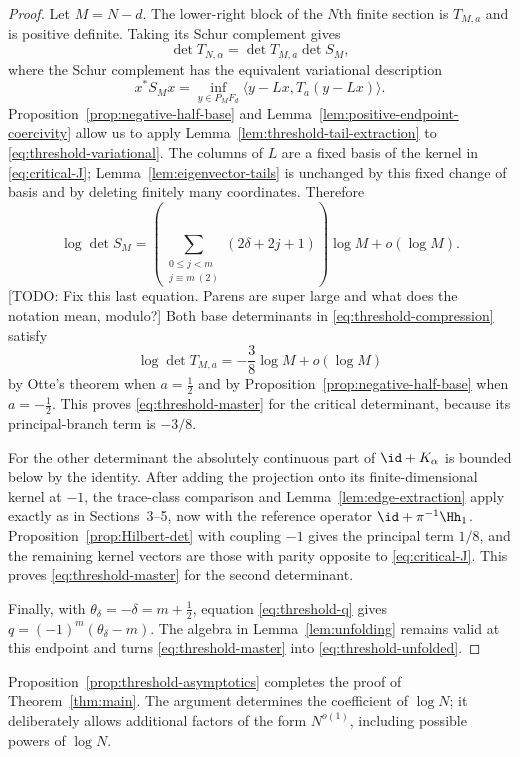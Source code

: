 \begin{proof}
Let $M=N-d$.  The lower-right block of the $N$th finite section is
$T_{M,a}$ and is positive definite.  Taking its Schur complement gives
\begin{equation}\label{eq:threshold-det-factorization}
 \det T_{N,\alpha}=\det T_{M,a}\det S_M,
\end{equation}
where the Schur complement has the equivalent variational description
\begin{equation}\label{eq:threshold-variational}
 x^*S_Mx
 =\inf_{y\in P_MF_d}
 \langle y-Lx,T_a(y-Lx)\rangle.
\end{equation}
Proposition~\ref{prop:negative-half-base} and
Lemma~\ref{lem:positive-endpoint-coercivity} allow us to apply
Lemma~\ref{lem:threshold-tail-extraction} to \eqref{eq:threshold-variational}.
The columns of $L$ are a fixed basis of the kernel in
\eqref{eq:critical-J}; Lemma~\ref{lem:eigenvector-tails} is unchanged by this
fixed change of basis and by deleting finitely many coordinates.  Therefore
\begin{equation}\label{eq:critical-schur-exponent}
 \log\det S_M
 =\left(
   \sum_{\substack{0\le j<m\\j\equiv m\ (2)}}
   (2\delta+2j+1)
  \right)\log M+o(\log M).
\end{equation}%
[TODO: Fix  this last equation. Parens are super large and what does
  the notation mean, modulo?]
Both base determinants in \eqref{eq:threshold-compression} satisfy
\begin{equation}\label{eq:base-three-eighths}
 \log\det T_{M,a}=-\frac38\log M+o(\log M)
\end{equation}
by Otte's theorem when $a=\frac12$ and by
Proposition~\ref{prop:negative-half-base} when $a=-\frac12$.  This proves
\eqref{eq:threshold-master} for the critical determinant, because its
principal-branch term is $-3/8$.

For the other determinant the absolutely continuous part of
$\id+K_\alpha$ is bounded below by the identity.  After adding the projection
onto its finite-dimensional kernel at $-1$, the trace-class comparison and
Lemma~\ref{lem:edge-extraction} apply exactly as in Sections~3--5, now with the
reference operator $\id+\pi^{-1}\Hh_1$.  Proposition~\ref{prop:Hilbert-det}
with coupling $-1$ gives the principal term $1/8$, and the remaining kernel
vectors are those with parity opposite to \eqref{eq:critical-J}.  This proves
\eqref{eq:threshold-master} for the second determinant.

Finally, with $\theta_\delta=-\delta=m+\frac12$, equation \eqref{eq:threshold-q} gives
$q=(-1)^m(\theta_\delta-m)$.  The algebra in Lemma~\ref{lem:unfolding} remains valid at
this endpoint and turns \eqref{eq:threshold-master} into
\eqref{eq:threshold-unfolded}.
\end{proof}

Proposition~\ref{prop:threshold-asymptotics} completes the proof of
Theorem~\ref{thm:main}.  The argument determines the coefficient of $\log N$;
it deliberately allows additional factors of the form $N^{o(1)}$, including
possible powers of $\log N$.
